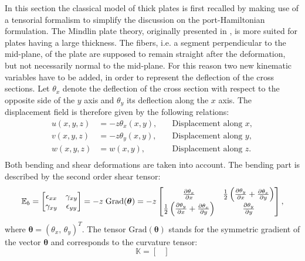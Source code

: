 \documentclass[preprint,12pt]{elsarticle}
\begin{document}
{In this section the classical model of thick plates is first recalled by making use of a tensorial formalism to simplify the discussion on the port-Hamiltonian formulation.} The Mindlin plate theory, originally presented in \cite{mindlin}, is more suited for plates having a large thickness. The fibers, i.e. a segment perpendicular to the mid-plane, of the plate are supposed to remain straight after the deformation, but not necessarily normal to the mid-plane. For this reason two new kinematic variables have to be added, in order to represent the deflection of the cross sections. { Let $\theta_x$ denote the deflection of the cross section with respect to the opposite side of the $y$ axis and  $\theta_y$ its deflection along the $x$ axis. The displacement field is therefore given by the following relations:
\begin{equation}
\begin{aligned}
u(x,y,z) &= -z \theta_x(x,y), \quad &\text{Displacement along $x$}, \\
v(x,y,z) &= -z \theta_y(x,y), \quad &\text{Displacement along $y$}, \\
w(x,y,z) &= w(x,y),  \quad &\text{Displacement along $z$}. \\
\end{aligned}
\end{equation}
Both bending and shear deformations are taken into account. The bending part is described by the second order shear tensor:
\begin{equation}
\mathbb{E}_b = 
\begin{bmatrix}
\epsilon_{xx} & \gamma_{xy} \\
\gamma_{xy} & \epsilon_{yy} \\
\end{bmatrix} = -z \; \mathrm{Grad}(\bm\theta) = -z
\begin{bmatrix}
\diffp{\theta_x}{x} & \frac{1}{2} \left( \diffp{\theta_y}{x} + \diffp{\theta_x}{y} \right)\\
\frac{1}{2} \left( \diffp{\theta_y}{x} + \diffp{\theta_x}{y} \right) & \diffp{\theta_y}{y} \\
\end{bmatrix},
\end{equation}
where $\bm{\theta} = (\theta_x, \, \theta_y)^T$. The tensor $\mathrm{Grad}(\bm{\theta})$ stands for the symmetric gradient of the vector $\bm{\theta}$ and corresponds to the curvature tensor:
\begin{equation}
\mathbb{K} = \begin{bmatrix}

\end{bmatrix}
\end{equation}}
\end{document}
